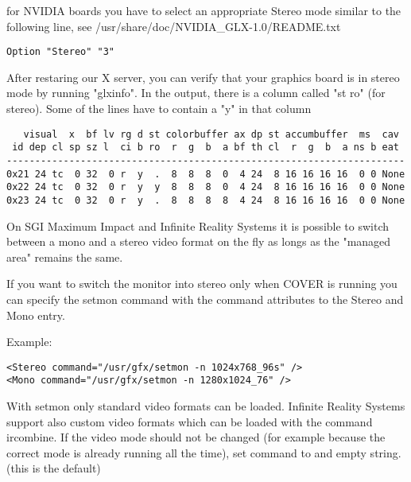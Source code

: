 for NVIDIA boards you have to select an appropriate Stereo mode similar to the following line, see
/usr/share/doc/NVIDIA\_GLX-1.0/README.txt

\begin{samepage}
\small \begin{verbatim}
Option "Stereo" "3"
\end{verbatim} \normalsize
\end{samepage}
After restaring our X server, you can verify that your graphics board is in stereo mode by running "glxinfo".
In the output, there is a column called "st ro" (for stereo). Some of the lines have to contain a "y" in that column

\begin{samepage}
\small \begin{verbatim}
   visual  x  bf lv rg d st colorbuffer ax dp st accumbuffer  ms  cav
 id dep cl sp sz l  ci b ro  r  g  b  a bf th cl  r  g  b  a ns b eat
----------------------------------------------------------------------
0x21 24 tc  0 32  0 r  y  .  8  8  8  0  4 24  8 16 16 16 16  0 0 None
0x22 24 tc  0 32  0 r  y  y  8  8  8  0  4 24  8 16 16 16 16  0 0 None
0x23 24 tc  0 32  0 r  y  .  8  8  8  8  4 24  8 16 16 16 16  0 0 None
\end{verbatim} \normalsize
\end{samepage}

On SGI Maximum Impact and Infinite Reality Systems it is 
possible to switch between a mono and a stereo video format on the fly 
as longs as the "managed area" remains the same.

If you want to
switch the monitor into stereo only when COVER is running you can
specify the setmon command with the command attributes to the Stereo and Mono entry.

Example:

\begin{samepage}
\small \begin{verbatim}
<Stereo command="/usr/gfx/setmon -n 1024x768_96s" />
<Mono command="/usr/gfx/setmon -n 1280x1024_76" />	
\end{verbatim} \normalsize
\end{samepage}

With setmon only standard video formats can be loaded. Infinite 
Reality Systems support also custom video formats which can be loaded
with the command ircombine.
If the video mode should not be changed (for example because the correct mode is
already running all the time), set command to and empty string. (this is the default)

